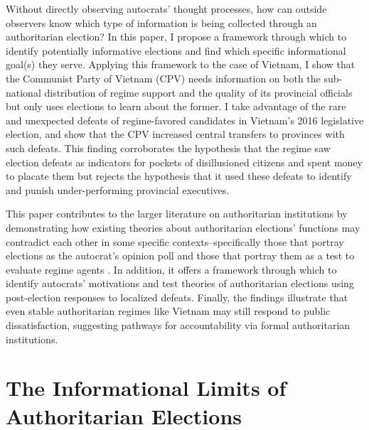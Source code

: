 \documentclass[12pt]{article}
\newcommand{\1}{\mathbbm{1}}
\begin{document}
Without directly observing autocrats' thought processes, how can outside observers know which type of information is being collected through an authoritarian election? In this paper, I propose a framework through which to identify potentially informative elections and find which specific informational goal(s) they serve. Applying this framework to the case of Vietnam, I show that the Communist Party of Vietnam (CPV) needs information on both the sub-national distribution of regime support and the quality of its provincial officials but only uses elections to learn about the former. I take advantage of the rare and unexpected defeats of regime-favored candidates in Vietnam's 2016 legislative election, and show that the CPV increased central transfers to provinces with such defeats. This finding corroborates the hypothesis that the regime saw election defeats as indicators for pockets of disillusioned citizens and spent money to placate them but rejects the hypothesis that it used these defeats to identify and punish under-performing provincial executives. %

This paper contributes to the larger literature on authoritarian institutions by demonstrating how existing theories about authoritarian elections' functions may contradict each other in some specific contexts--specifically those that portray elections as the autocrat's opinion poll \citep[e.g.][]{Miller2015, Magaloni2006, Blaydes2010} and those that portray them as a test to evaluate regime agents \citep[e.g.][]{Magaloni2006, Blaydes2010,Myagkov2009,RundlettSvolik2016}. In addition, it offers a framework through which to identify autocrats' motivations and test theories of authoritarian elections using post-election responses to localized defeats. Finally, the findings illustrate that even stable authoritarian regimes like Vietnam may still respond to public dissatisfaction, suggesting pathways for accountability via formal authoritarian institutions.


\section*{The Informational Limits of Authoritarian Elections}
\label{sec:theory_limits}
\end{document}
